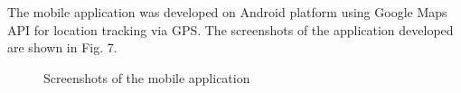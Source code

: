 \documentclass[conference]{IEEEtran}
\begin{document}
The mobile application was developed on Android platform using Google Maps API for location tracking via GPS. The screenshots of the application developed are shown in Fig. 7.
\begin{figure}[!tbp]
  \centering
  \hfill
  \caption{Screenshots of the mobile application}
\end{figure}
\end{document}
